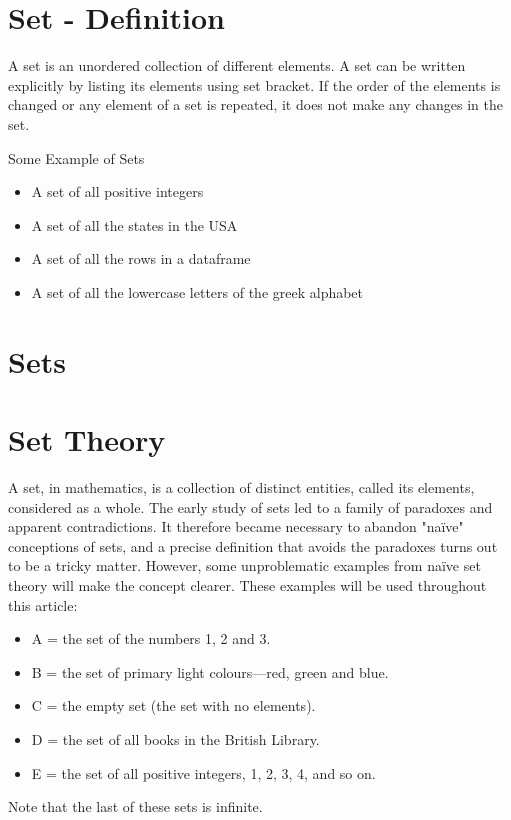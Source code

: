 \documentclass[12pt]{article}
\begin{document}
\section{Set - Definition}
A set is an unordered collection of different elements. A set can be written explicitly by listing its elements using set bracket. If the order of the elements is changed or any element of a set is repeated, it does not make any changes in the set.

Some Example of Sets
\begin{itemize}
\item A set of all positive integers
\item A set of all the states in the USA
\item A set of all the rows in a dataframe
\item A set of all the lowercase letters of the greek alphabet
\end{itemize}
\section{Sets}
\smallskip   %

\section{Set Theory}
A set, in mathematics, is a collection of distinct entities, called its elements, considered as a whole. The early study of sets led to a family of paradoxes and apparent contradictions. It therefore became necessary to abandon "naïve" conceptions of sets, and a precise definition that avoids the paradoxes turns out to be a tricky matter. However, some unproblematic examples from naïve set theory will make the concept clearer. These examples will be used throughout this article:

\begin{itemize}
\item A = the set of the numbers 1, 2 and 3.
\item B = the set of primary light colours—red, green and blue.
\item C = the empty set (the set with no elements).
\item D = the set of all books in the British Library.
\item E = the set of all positive integers, 1, 2, 3, 4, and so on.
\end{itemize}

Note that the last of these sets is infinite.
\end{document}
